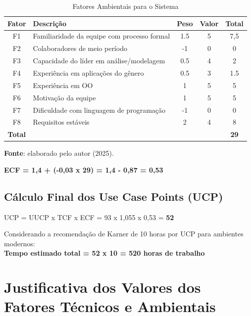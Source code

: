 \begin{longtable}{|c|p{}|c|c|c|}
\caption{Fatores Ambientais para o Sistema}
\label{tab:fatores-ambientais}\\
\hline
\textbf{Fator} & \textbf{Descrição} & \textbf{Peso} & \textbf{Valor} & \textbf{Total} \\
\hline
\endfirsthead
\endhead
F1 & Familiaridade da equipe com processo formal & 1.5 & 5 & 7,5 \\
\hline
F2 & Colaboradores de meio período & -1 & 0 & 0 \\
\hline
F3 & Capacidade do líder em análise/modelagem & 0.5 & 4 & 2 \\
\hline
F4 & Experiência em aplicações do gênero & 0.5 & 3 & 1.5 \\
\hline
F5 & Experiência em OO & 1 & 5 & 5 \\
\hline
F6 & Motivação da equipe & 1 & 5 & 5 \\
\hline
F7 & Dificuldade com linguagem de programação & -1 & 0 & 0 \\
\hline
F8 & Requisitos estáveis & 2 & 4 & 8 \\
\hline
\textbf{Total} & & & & \textbf{29} \\
\hline
\end{longtable}

\begin{center}
    \small{\textbf{Fonte}: elaborado pelo autor (2025).}
\end{center}



\textbf{ECF = 1,4 + (-0,03 x 29) = 1,4 - 0,87 = 0,53}

\subsection{Cálculo Final dos Use Case Points (UCP)}

UCP = UUCP x TCF x ECF = 93 x 1,055 x 0,53 = \textbf{52}

Considerando a recomendação de Karner de 10 horas por UCP para ambientes modernos:
\\
\textbf{Tempo estimado total = 52 x 10 = 520 horas de trabalho}

\section{Justificativa dos Valores dos Fatores Técnicos e Ambientais}

